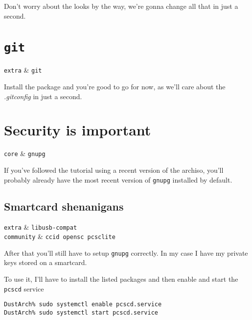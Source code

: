 \documentclass[10pt]{dustdoc}
\begin{document}
Don’t worry about the looks by the way, we’re gonna change all that in just a second.

\section{\texttt{git}}
\label{sec:git}

\begin{packagetable}
    \texttt{extra} & \texttt{git} \\
\end{packagetable}

Install the package and you’re good to go for now, as we’ll care about the \textit{.gitconfig} in just a second.

\section{Security is important}
\label{sec:security-is-important}

\begin{packagetable}
    \texttt{core} & \texttt{gnupg} \\
\end{packagetable}

If you’ve followed the tutorial using a recent version of the archiso, you’ll probably already have the most recent version of \texttt{gnupg} installed by default.

\subsection{Smartcard shenanigans}
\label{sec:smartcard-shenanigans}

\begin{packagetable}
    \texttt{extra} & \texttt{libusb-compat} \\
    \texttt{community} & \texttt{ccid opensc pcsclite} \\
\end{packagetable}

After that you’ll still have to setup \texttt{gnupg} correctly.
In my case I have my private keys stored on a smartcard.

To use it, I’ll have to install the listed packages and then enable and start the \texttt{pcscd} service

\begin{verbatim}
DustArch% sudo systemctl enable pcscd.service
DustArch% sudo systemctl start pcscd.service
\end{verbatim}
\end{document}
